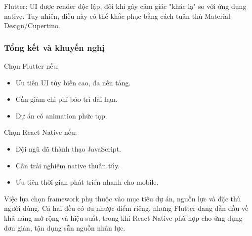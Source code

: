     \begin{flushleft}
      \hspace*{0.8cm}Flutter: UI được render độc lập, đôi khi gây cảm giác "khác lạ" so với ứng dụng native. Tuy nhiên, điều này có thể khắc phục bằng cách tuân thủ Material Design/Cupertino.
    \end{flushleft}

    \subsubsection{Tổng kết và khuyến nghị}
    \begin{flushleft}
      \hspace*{0.8cm}Chọn Flutter nếu:
      \setlength{\leftmargini}{1.5cm}
      \begin{itemize}
        \item Ưu tiên UI tùy biến cao, đa nền tảng.
        \item Cần giảm chi phí bảo trì dài hạn.
        \item Dự án có animation phức tạp.
      \end{itemize}
    \end{flushleft}

    \begin{flushleft}
      \hspace*{0.8cm}Chọn React Native nếu:
      \setlength{\leftmargini}{1.5cm}
      \begin{itemize}
          \item Đội ngũ đã thành thạo JavaScript.
          \item Cần trải nghiệm native thuần túy.
          \item Ưu tiên thời gian phát triển nhanh cho mobile.
      \end{itemize}
    \end{flushleft}

    \begin{flushleft}
      \hspace*{0.8cm}Việc lựa chọn framework phụ thuộc vào mục tiêu dự án, nguồn lực và đặc thù người dùng. Cả hai đều có ưu nhược điểm riêng, nhưng Flutter đang dẫn đầu về khả năng mở rộng và hiệu suất, trong khi React Native phù hợp cho ứng dụng đơn giản, tận dụng sẵn nguồn nhân lực.
    \end{flushleft}